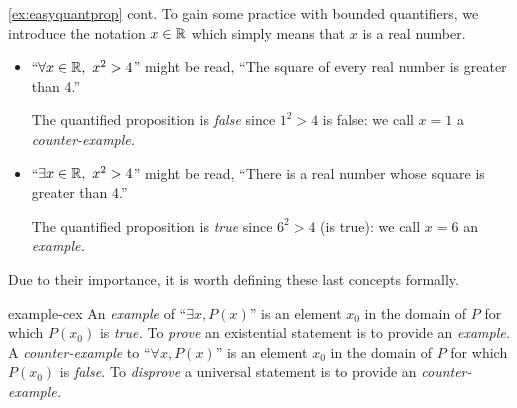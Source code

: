 \begin{example*}{\ref{ex:easyquantprop} cont.}{}
	To gain some practice with bounded quantifiers, we introduce the notation $x\in\mathbb{R}$ which simply means that $x$ is a real number.\footnotemark{}
	\begin{itemize}
	  \item ``$\forall x\in\mathbb{R},\ x^2>4$'' might be read, ``The square of every real number is greater than 4.''\par
	  The quantified proposition is \emph{false} since $1^2>4$ is false: we call $x=1$ a \emph{counter-example.}
	  \item ``$\exists x\in\mathbb{R},\ x^2>4$'' might be read, ``There is a real number whose square is greater than 4.''\par
	  The quantified proposition is \emph{true} since $6^2>4$ (is true): we call $x=6$ an \emph{example.}
	\end{itemize}
\end{example*}


Due to their importance, it is worth defining these last concepts formally.

\begin{defn}{}{example-cex}
	An \emph{example} of ``$\exists x, P(x)$'' is an element $x_0$ in the domain of $P$ for which $P(x_0)$ is \emph{true.} To \emph{prove} an existential statement is to provide an \emph{example.}\smallbreak
	A \emph{counter-example} to ``$\forall x, P(x)$'' is an element $x_0$ in the domain of $P$ for which $P(x_0)$ is \emph{false.} To \emph{disprove} a universal statement is to provide an \emph{counter-example.}
\end{defn}


\goodbreak


% 



